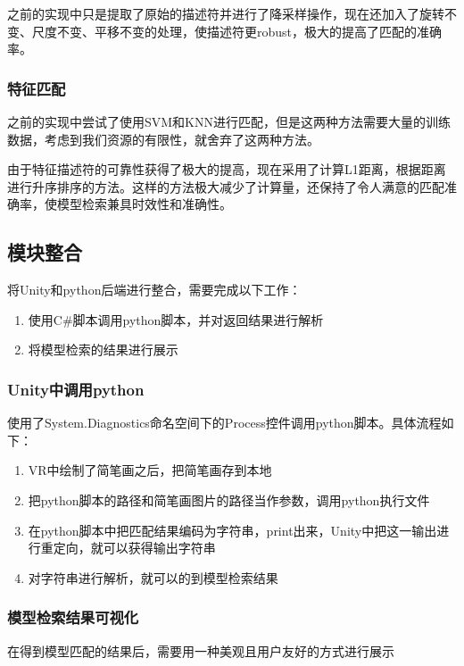 \documentclass{article}
\begin{document}
之前的实现中只是提取了原始的描述符并进行了降采样操作，现在还加入了旋转不变、尺度不变、平移不变的处理，使描述符更robust，极大的提高了匹配的准确率。

\subsubsection{特征匹配}   
之前的实现中尝试了使用SVM和KNN进行匹配，但是这两种方法需要大量的训练数据，考虑到我们资源的有限性，就舍弃了这两种方法。

由于特征描述符的可靠性获得了极大的提高，现在采用了计算L1距离，根据距离进行升序排序的方法。这样的方法极大减少了计算量，还保持了令人满意的匹配准确率，使模型检索兼具时效性和准确性。

\subsection{模块整合}
将Unity和python后端进行整合，需要完成以下工作：

\begin{enumerate}
    \item 使用C\#脚本调用python脚本，并对返回结果进行解析
    \item 将模型检索的结果进行展示
\end{enumerate}

\subsubsection{Unity中调用python}
使用了System.Diagnostics命名空间下的Process控件调用python脚本。具体流程如下：
\begin{enumerate}
    \item VR中绘制了简笔画之后，把简笔画存到本地
    \item 把python脚本的路径和简笔画图片的路径当作参数，调用python执行文件
    \item 在python脚本中把匹配结果编码为字符串，print出来，Unity中把这一输出进行重定向，就可以获得输出字符串
    \item 对字符串进行解析，就可以的到模型检索结果
\end{enumerate}

\subsubsection{模型检索结果可视化}
在得到模型匹配的结果后，需要用一种美观且用户友好的方式进行展示
\end{document}
